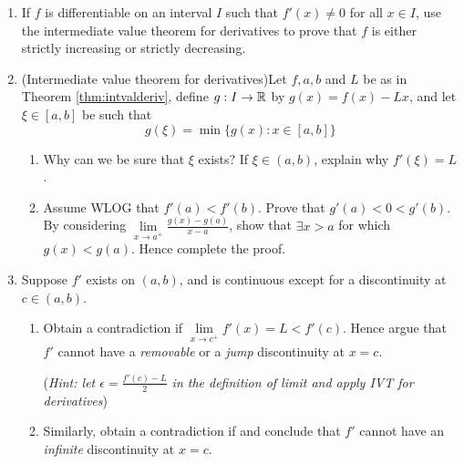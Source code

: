 \begin{exercises}
\begin{enumerate}
		
	  \item\label{exs:fincdec} If $f$ is differentiable on an interval $I$ such that $f'(x)\neq 0$ for all $x\in I$, use the intermediate value theorem for derivatives to prove that $f$ is either strictly increasing or strictly decreasing.
	  
	  
	  \item\label{exs:ivtderivs} (Intermediate value theorem for derivatives)\quad Let $f,a,b$ and $L$ be as in Theorem \ref{thm:intvalderiv}, define $g:I\to\mathbb{R}$ by $g(x)=f(x)-Lx$, and let $\xi\in[a,b]$ be such that
		\[
			g(\xi)=\min\bigl\{g(x):x\in[a,b]\bigr\}
		\]
		\begin{enumerate}
		  \item Why can we be sure that $\xi$ exists? If $\xi\in(a,b)$, explain why $f'(\xi)=L$.
			\item Assume WLOG that $f'(a)<f'(b)$. Prove that $g'(a)<0<g'(b)$. By considering $\lim\limits_{x\to a^+}\frac{g(x)-g(a)}{x-a}$, show that $\exists x>a$ for which $g(x)<g(a)$. Hence complete the proof.
		\end{enumerate}
	  
	  
	  \item Suppose $f'$ exists on $(a,b)$, and is continuous except for a discontinuity at $c\in(a,b)$.
	  \begin{enumerate}
	    \item Obtain a contradiction if $\lim\limits_{x\to c^+}f'(x)=L<f'(c)$. Hence argue that $f'$ cannot have a \emph{removable} or a \emph{jump} discontinuity at $x=c$.\par
	    (\emph{Hint: let $\epsilon=\frac{f'(c)-L}2$ in the definition of limit and apply IVT for derivatives})
	    
	    \item Similarly, obtain a contradiction if  and conclude that $f'$ cannot have an \emph{infinite} discontinuity at $x=c$.
	    

\end{enumerate}
\end{enumerate}
\end{exercises}
